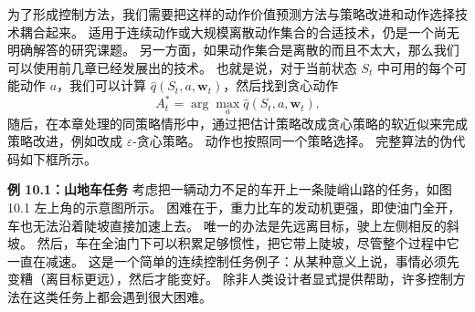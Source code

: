 \documentclass[UTF8,12pt,a4paper,fontset=fandol]{ctexart}
\begin{document}
为了形成控制方法，我们需要把这样的动作价值预测方法与策略改进和动作选择技术耦合起来。
适用于连续动作或大规模离散动作集合的合适技术，仍是一个尚无明确解答的研究课题。
另一方面，如果动作集合是离散的而且不太大，那么我们可以使用前几章已经发展出的技术。
也就是说，对于当前状态 $S_t$ 中可用的每个可能动作 $a$，我们可以计算 $\hat q(S_t,a,\mathbf{w}_t)$，然后找到贪心动作
\[
A_t^*=\arg\max_a\hat q(S_t,a,\mathbf{w}_t).
\]
随后，在本章处理的同策略情形中，通过把估计策略改成贪心策略的软近似来完成策略改进，例如改成 $\varepsilon$-贪心策略。
动作也按照同一个策略选择。
完整算法的伪代码如下框所示。

\begin{center}
\end{center}

\noindent\textbf{例 10.1：山地车任务}
考虑把一辆动力不足的车开上一条陡峭山路的任务，如图 10.1 左上角的示意图所示。
困难在于，重力比车的发动机更强，即使油门全开，车也无法沿着陡坡直接加速上去。
唯一的办法是先远离目标，驶上左侧相反的斜坡。
然后，车在全油门下可以积累足够惯性，把它带上陡坡，尽管整个过程中它一直在减速。
这是一个简单的连续控制任务例子：从某种意义上说，事情必须先变糟（离目标更远），然后才能变好。
除非人类设计者显式提供帮助，许多控制方法在这类任务上都会遇到很大困难。
\end{document}
